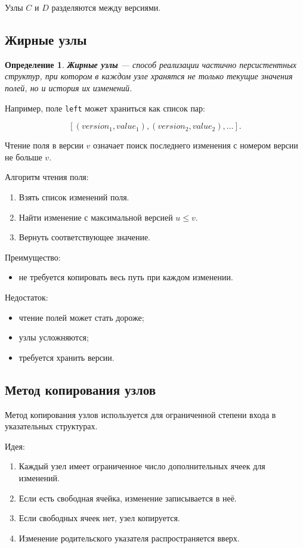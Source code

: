 \documentclass[12pt,a4paper]{article}
\newtheorem{definition}{Определение}
\begin{document}
Узлы $C$ и $D$ разделяются между версиями.

\subsection{Жирные узлы}

\begin{definition}
\textbf{Жирные узлы} --- способ реализации частично персистентных структур, при котором в каждом узле хранятся не только текущие значения полей, но и история их изменений.
\end{definition}

Например, поле \texttt{left} может храниться как список пар:

\[
[(version_1, value_1), (version_2, value_2), \dots].
\]

Чтение поля в версии $v$ означает поиск последнего изменения с номером версии не больше $v$.

Алгоритм чтения поля:

\begin{enumerate}
  \item Взять список изменений поля.
  \item Найти изменение с максимальной версией $u \le v$.
  \item Вернуть соответствующее значение.
\end{enumerate}

Преимущество:
\begin{itemize}
  \item не требуется копировать весь путь при каждом изменении.
\end{itemize}

Недостаток:
\begin{itemize}
  \item чтение полей может стать дороже;
  \item узлы усложняются;
  \item требуется хранить версии.
\end{itemize}

\subsection{Метод копирования узлов}

Метод копирования узлов используется для ограниченной степени входа в указательных структурах.

Идея:

\begin{enumerate}
  \item Каждый узел имеет ограниченное число дополнительных ячеек для изменений.
  \item Если есть свободная ячейка, изменение записывается в неё.
  \item Если свободных ячеек нет, узел копируется.
  \item Изменение родительского указателя распространяется вверх.
\end{enumerate}
\end{document}

